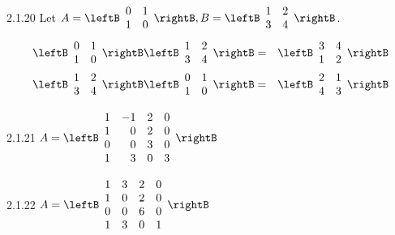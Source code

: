 \begin{Answer}{2.1.20}
Let $A = \leftB
\begin{array}{cc}
0 & 1 \\
1 & 0
\end{array}
\rightB , B = \leftB
\begin{array}{cc}
1 & 2 \\
3 & 4
\end{array}
\rightB $.
\begin{eqnarray*}
\leftB
\begin{array}{cc}
0 & 1 \\
1 & 0
\end{array}
\rightB
 \leftB
\begin{array}{cc}
1 & 2 \\
3 & 4
\end{array}
\rightB  &=&
 \leftB
\begin{array}{cc}
3 & 4 \\
1 & 2
\end{array}
\rightB \\
\leftB
\begin{array}{cc}
1 & 2 \\
3 & 4
\end{array}
\rightB \leftB
\begin{array}{cc}
0 & 1 \\
1 & 0
\end{array}
\rightB
&=& \leftB
\begin{array}{cc}
2 & 1 \\
4 & 3
\end{array}
\rightB
\end{eqnarray*}
\end{Answer}
\begin{Answer}{2.1.21}
$A=\leftB
\begin{array}{rrrr}
1 & -1 & 2 & 0 \\
1 & 0 & 2 & 0 \\
0 & 0 & 3 & 0 \\
1 & 3 & 0 & 3
\end{array}
\rightB $
\end{Answer}
\begin{Answer}{2.1.22}
$A=\leftB
\begin{array}{rrrr}
1 & 3 & 2 & 0 \\
1 & 0 & 2 & 0 \\
0 & 0 & 6 & 0 \\
1 & 3 & 0 & 1
\end{array}
\rightB$
\end{Answer}
